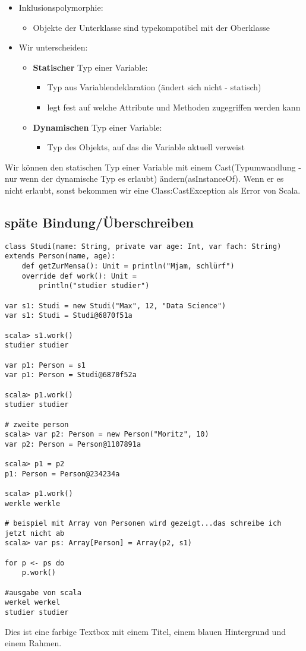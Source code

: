 \begin{itemize}
	\item Inklusionspolymorphie:
	\begin{itemize}
		\item Objekte der Unterklasse sind typekompotibel mit der Oberklasse
	\end{itemize}
	\item Wir unterscheiden:
\begin{itemize}
	\item \textbf{Statischer} Typ einer Variable:
	\begin{itemize}
		\item Typ aus Variablendeklaration (ändert sich nicht - statisch)
		\item legt fest auf welche Attribute und Methoden zugegriffen werden kann
	\end{itemize}
	\item \textbf{Dynamischen} Typ einer Variable:
	\begin{itemize}
		\item Typ des Objekts, auf das die Variable aktuell verweist
	\end{itemize}
\end{itemize}
\end{itemize}
Wir können den statischen Typ einer Variable mit einem Cast(Typumwandlung - nur wenn der dynamische Typ es erlaubt) ändern(asInstanceOf). Wenn er es nicht erlaubt, sonst bekommen wir eine Class:CastException als Error von Scala.

\subsection{späte Bindung/Überschreiben}
\begin{verbatim}
class Studi(name: String, private var age: Int, var fach: String) extends Person(name, age):
	def getZurMensa(): Unit = println("Mjam, schlürf")
	override def work(): Unit =
		println("studier studier")
		
var s1: Studi = new Studi("Max", 12, "Data Science")
var s1: Studi = Studi@6870f51a

scala> s1.work()
studier studier

var p1: Person = s1
var p1: Person = Studi@6870f52a

scala> p1.work()
studier studier

# zweite person
scala> var p2: Person = new Person("Moritz", 10)
var p2: Person = Person@1107891a

scala> p1 = p2
p1: Person = Person@234234a

scala> p1.work()
werkle werkle

# beispiel mit Array von Personen wird gezeigt...das schreibe ich jetzt nicht ab
scala> var ps: Array[Person] = Array(p2, s1)

for p <- ps do
	p.work()
	
#ausgabe von scala
werkel werkel
studier studier
\end{verbatim}

\begin{tcolorbox}[colback=blue!5!white, colframe=blue!75!black, title=Beispiel-Titel, width=\textwidth]
Dies ist eine farbige Textbox mit einem Titel, einem blauen Hintergrund und einem Rahmen.
\end{tcolorbox}